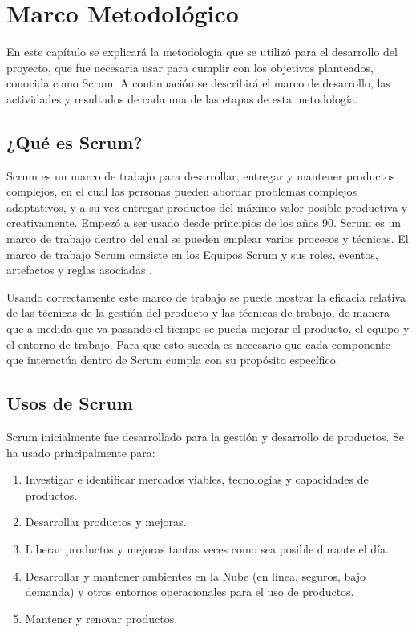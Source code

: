 \chapter{Marco Metodológico}
En este capítulo se explicará la metodología que se utilizó para el desarrollo del proyecto, que fue necesaria usar para cumplir con los objetivos planteados, conocida como Scrum. A continuación se describirá el marco de desarrollo, las actividades y resultados de cada una de las etapas de esta metodología.

\section{¿Qué es Scrum?}
Scrum es un marco de trabajo para desarrollar, entregar y mantener productos complejos, en el cual las personas pueden abordar problemas complejos adaptativos, y a su vez entregar productos del máximo valor posible productiva y creativamente. Empezó a ser usado desde principios de los años 90. Scrum es un marco de trabajo dentro del cual se pueden emplear varios procesos y técnicas. El marco de trabajo Scrum consiste en los Equipos Scrum y sus roles, eventos, artefactos y reglas asociadas \cite{scrumSchwaber}.

Usando correctamente este marco de trabajo se puede mostrar la eficacia relativa de las técnicas de la gestión del producto y las técnicas de trabajo, de manera que a medida que va pasando el tiempo se pueda mejorar el producto, el equipo y el entorno de trabajo. Para que esto suceda es necesario que cada componente que interactúa dentro de Scrum cumpla con su propósito específico.

\section{Usos de Scrum}
Scrum inicialmente fue desarrollado para la gestión y desarrollo de productos. Se ha usado principalmente para:

\begin{enumerate}
	\item Investigar e identificar mercados viables, tecnologías y capacidades de productos.
	\item Desarrollar productos y mejoras.
	\item Liberar productos y mejoras tantas veces como sea posible durante el día.
	\item Desarrollar y mantener ambientes en la Nube (en línea, seguros, bajo demanda) y otros entornos operacionales para el uso de productos.
	\item Mantener y renovar productos.
\end{enumerate}

